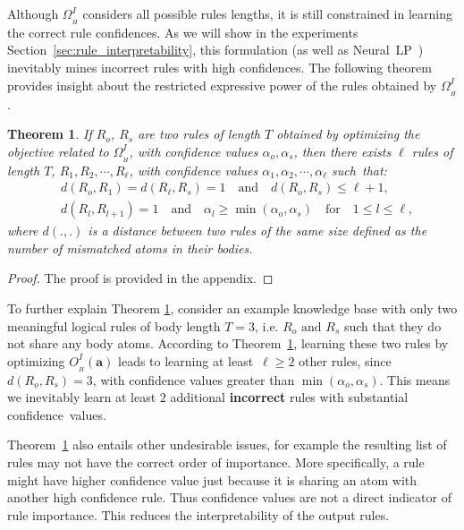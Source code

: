 \documentclass{article}
\newtheorem{theorem}{Theorem}
\newcommand{\mb}[1]{\mathbf{#1}}
\begin{document}
Although $\Omega^I_{\scriptstyle_{H}}$ considers all possible rules lengths, it is still constrained in learning the correct rule confidences. As we will show in the experiments Section~\ref{sec:rule_interpretability}, this formulation (as well as Neural~LP~\cite{yang2017differentiable}) inevitably mines incorrect rules with high confidences. The following theorem provides insight about the restricted expressive power of the rules obtained by $\Omega^I_{\scriptstyle_{H}}$.

\begin{theorem}
\label{thr:theorem_1}
If $R_o$, $R_s$ are two rules of length $T$ obtained by optimizing the objective related to $\Omega^I_{\scriptstyle_{H}}$, with confidence values $\alpha_o, \alpha_s$, then there exists $\ell$ rules of length $T$, $R_1, R_2, \cdots, R_{\ell}$, with confidence values $\alpha_1, \alpha_2, \cdots, \alpha_{\ell}$ such~that:
\begin{align*}
    & d(R_o, R_1) =d(R_{\ell}, R_s)=1 \quad \text{and} \quad  d(R_o, R_s) \leq \ell +1, \\
    & d(R_l, R_{l+1})=1 \quad \text{and} \quad \alpha_l \geq  \min(\alpha_o, \alpha_s) \quad \text{for} \quad 1 \leq l \leq \ell,
\end{align*}
where $d(.,.)$ is a distance between two rules of the same size defined as the number of mismatched atoms in their bodies.
\end{theorem}
\begin{proof} The proof is provided in the appendix.
\end{proof}

To further explain Theorem \ref{thr:theorem_1}, consider an example knowledge base with only two meaningful logical rules of body length $T=3$, i.e. $R_o \text{ and } R_s$ such that they do not share any body atoms. According to Theorem~\ref{thr:theorem_1}, learning these two rules by optimizing $O^I_{\scriptstyle_{H}}(\mb{a})$ leads to learning at \mbox{least~$\ell \geq 2$} other rules, since $d(R_o, R_s)=3$, with confidence values greater than $\min(\alpha_o, \alpha_s)$. This means we inevitably learn at least $2$ additional \textbf{incorrect} rules with substantial confidence~values.

Theorem~\ref{thr:theorem_1} also entails other undesirable issues, for example the resulting list of rules may not have the correct order of importance. More specifically, a rule might have higher confidence value just because it is sharing an atom with another high confidence rule. Thus confidence values are not a direct indicator of rule importance. This reduces the interpretability of the output rules.
\end{document}
